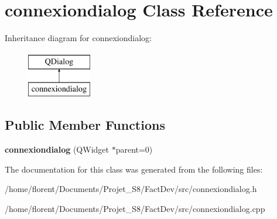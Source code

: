 \hypertarget{classconnexiondialog}{\section{connexiondialog Class Reference}
\label{classconnexiondialog}
}
Inheritance diagram for connexiondialog\-:\begin{figure}[H]
\begin{center}
\leavevmode
\includegraphics[height=2.000000cm]{dc/db6/classconnexiondialog}
\end{center}
\end{figure}
\subsection*{Public Member Functions}
\begin{DoxyCompactItemize}
\item 
\hypertarget{classconnexiondialog_a96f24b7b0ed87e2cbe4866d1b931710e}{{\bfseries connexiondialog} (Q\-Widget $\ast$parent=0)}\label{classconnexiondialog_a96f24b7b0ed87e2cbe4866d1b931710e}

\end{DoxyCompactItemize}


The documentation for this class was generated from the following files\-:\begin{DoxyCompactItemize}
\item 
/home/florent/\-Documents/\-Projet\-\_\-\-S8/\-Fact\-Dev/src/connexiondialog.\-h\item 
/home/florent/\-Documents/\-Projet\-\_\-\-S8/\-Fact\-Dev/src/connexiondialog.\-cpp\end{DoxyCompactItemize}
